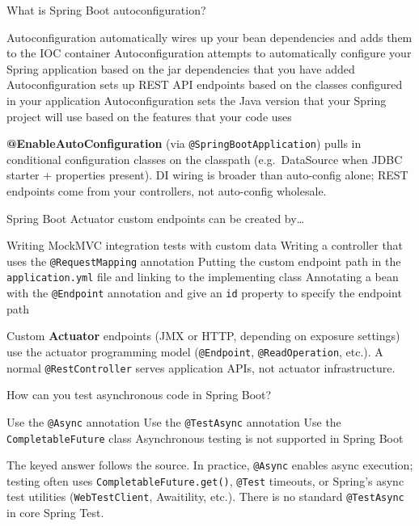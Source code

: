 \question[4]
What is Spring Boot autoconfiguration?
\begin{choices}
  \choice Autoconfiguration automatically wires up your bean dependencies and adds them to the IOC container
  \CorrectChoice Autoconfiguration attempts to automatically configure your Spring application based on the jar dependencies that you have added
  \choice Autoconfiguration sets up REST API endpoints based on the classes configured in your application
  \choice Autoconfiguration sets the Java version that your Spring project will use based on the features that your code uses
\end{choices}
\begin{solution}
  \textbf{@EnableAutoConfiguration} (via \texttt{@SpringBootApplication}) pulls in conditional configuration classes on the classpath (e.g.\ DataSource when JDBC starter + properties present). DI wiring is broader than auto-config alone; REST endpoints come from your controllers, not auto-config wholesale.
\end{solution}

\question[4]
Spring Boot Actuator custom endpoints can be created by\ldots
\begin{choices}
  \choice Writing MockMVC integration tests with custom data
  \choice Writing a controller that uses the \texttt{@RequestMapping} annotation
  \choice Putting the custom endpoint path in the \texttt{application.yml} file and linking to the implementing class
  \CorrectChoice Annotating a bean with the \texttt{@Endpoint} annotation and give an \texttt{id} property to specify the endpoint path
\end{choices}
\begin{solution}
  Custom \textbf{Actuator} endpoints (JMX or HTTP, depending on exposure settings) use the actuator programming model (\texttt{@Endpoint}, \texttt{@ReadOperation}, etc.). A normal \texttt{@RestController} serves application APIs, not actuator infrastructure.
\end{solution}

\question[4]
How can you test asynchronous code in Spring Boot?
\begin{choices}
  \choice Use the \texttt{@Async} annotation
  \choice Use the \texttt{@TestAsync} annotation
  \CorrectChoice Use the \texttt{CompletableFuture} class
  \choice Asynchronous testing is not supported in Spring Boot
\end{choices}
\begin{solution}
  The keyed answer follows the source. In practice, \texttt{@Async} enables async execution; testing often uses \texttt{CompletableFuture.get()}, \texttt{@Test} timeouts, or Spring's async test utilities (\texttt{WebTestClient}, Awaitility, etc.). There is no standard \texttt{@TestAsync} in core Spring Test.
\end{solution}

